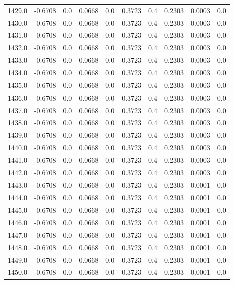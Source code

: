 \begin{longtable}{lrrrrrrrrr}
1429.0 & -0.6708 & 0.0 & 0.0668 & 0.0 & 0.3723 & 0.4 & 0.2303 & 0.0003 & 0.0 \\
1430.0 & -0.6708 & 0.0 & 0.0668 & 0.0 & 0.3723 & 0.4 & 0.2303 & 0.0003 & 0.0 \\
1431.0 & -0.6708 & 0.0 & 0.0668 & 0.0 & 0.3723 & 0.4 & 0.2303 & 0.0003 & 0.0 \\
1432.0 & -0.6708 & 0.0 & 0.0668 & 0.0 & 0.3723 & 0.4 & 0.2303 & 0.0003 & 0.0 \\
1433.0 & -0.6708 & 0.0 & 0.0668 & 0.0 & 0.3723 & 0.4 & 0.2303 & 0.0003 & 0.0 \\
1434.0 & -0.6708 & 0.0 & 0.0668 & 0.0 & 0.3723 & 0.4 & 0.2303 & 0.0003 & 0.0 \\
1435.0 & -0.6708 & 0.0 & 0.0668 & 0.0 & 0.3723 & 0.4 & 0.2303 & 0.0003 & 0.0 \\
1436.0 & -0.6708 & 0.0 & 0.0668 & 0.0 & 0.3723 & 0.4 & 0.2303 & 0.0003 & 0.0 \\
1437.0 & -0.6708 & 0.0 & 0.0668 & 0.0 & 0.3723 & 0.4 & 0.2303 & 0.0003 & 0.0 \\
1438.0 & -0.6708 & 0.0 & 0.0668 & 0.0 & 0.3723 & 0.4 & 0.2303 & 0.0003 & 0.0 \\
1439.0 & -0.6708 & 0.0 & 0.0668 & 0.0 & 0.3723 & 0.4 & 0.2303 & 0.0003 & 0.0 \\
1440.0 & -0.6708 & 0.0 & 0.0668 & 0.0 & 0.3723 & 0.4 & 0.2303 & 0.0003 & 0.0 \\
1441.0 & -0.6708 & 0.0 & 0.0668 & 0.0 & 0.3723 & 0.4 & 0.2303 & 0.0003 & 0.0 \\
1442.0 & -0.6708 & 0.0 & 0.0668 & 0.0 & 0.3723 & 0.4 & 0.2303 & 0.0003 & 0.0 \\
1443.0 & -0.6708 & 0.0 & 0.0668 & 0.0 & 0.3723 & 0.4 & 0.2303 & 0.0001 & 0.0 \\
1444.0 & -0.6708 & 0.0 & 0.0668 & 0.0 & 0.3723 & 0.4 & 0.2303 & 0.0001 & 0.0 \\
1445.0 & -0.6708 & 0.0 & 0.0668 & 0.0 & 0.3723 & 0.4 & 0.2303 & 0.0001 & 0.0 \\
1446.0 & -0.6708 & 0.0 & 0.0668 & 0.0 & 0.3723 & 0.4 & 0.2303 & 0.0001 & 0.0 \\
1447.0 & -0.6708 & 0.0 & 0.0668 & 0.0 & 0.3723 & 0.4 & 0.2303 & 0.0001 & 0.0 \\
1448.0 & -0.6708 & 0.0 & 0.0668 & 0.0 & 0.3723 & 0.4 & 0.2303 & 0.0001 & 0.0 \\
1449.0 & -0.6708 & 0.0 & 0.0668 & 0.0 & 0.3723 & 0.4 & 0.2303 & 0.0001 & 0.0 \\
1450.0 & -0.6708 & 0.0 & 0.0668 & 0.0 & 0.3723 & 0.4 & 0.2303 & 0.0001 & 0.0 \\

\end{longtable}
